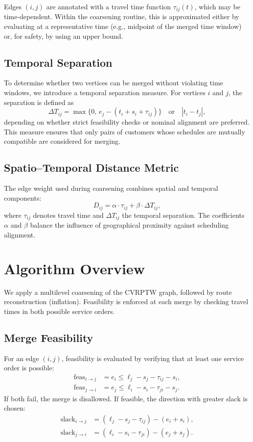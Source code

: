 \documentclass[conference]{IEEEtran}
\begin{document}
Edges $(i,j)$ are annotated with a travel time function $\tau_{ij}(t)$, which may be time-dependent. Within the coarsening routine, this is approximated either by evaluating at a representative time (e.g., midpoint of the merged time window) or, for safety, by using an upper bound.

\subsection{Temporal Separation}
To determine whether two vertices can be merged without violating time windows, we introduce a temporal separation measure. For vertices $i$ and $j$, the separation is defined as
\[
\Delta T_{ij} = \max\{0,\, e_j - (t_i + s_i + \tau_{ij})\}
\quad \text{or} \quad |t_i - t_j|,
\]
depending on whether strict feasibility checks or nominal alignment are preferred. This measure ensures that only pairs of customers whose schedules are mutually compatible are considered for merging.

\subsection{Spatio--Temporal Distance Metric}
The edge weight used during coarsening combines spatial and temporal components:
\[
D_{ij} = \alpha \cdot \tau_{ij} + \beta \cdot \Delta T_{ij},
\]
where $\tau_{ij}$ denotes travel time and $\Delta T_{ij}$ the temporal separation. The coefficients $\alpha$ and $\beta$ balance the influence of geographical proximity against scheduling alignment.



\section{Algorithm Overview}
We apply a multilevel coarsening of the CVRPTW graph, followed by route reconstruction (inflation). Feasibility is enforced at each merge by checking travel times in both possible service orders.

\subsection{Merge Feasibility}
For an edge $(i,j)$, feasibility is evaluated by verifying that at least one service order is possible:
\[
\begin{aligned}
  \mathrm{feas}_{i \to j} &= e_i \le \ell_j - s_j - \tau_{ij} - s_i, \\
  \mathrm{feas}_{j \to i} &= e_j \le \ell_i - s_i - \tau_{ji} - s_j.
\end{aligned}
\]
If both fail, the merge is disallowed. If feasible, the direction with greater slack is chosen:
\[
\begin{aligned}
  \mathrm{slack}_{i \to j} &= (\ell_j - s_j - \tau_{ij}) - (e_i + s_i), \\
  \mathrm{slack}_{j \to i} &= (\ell_i - s_i - \tau_{ji}) - (e_j + s_j).
\end{aligned}
\]
\end{document}
